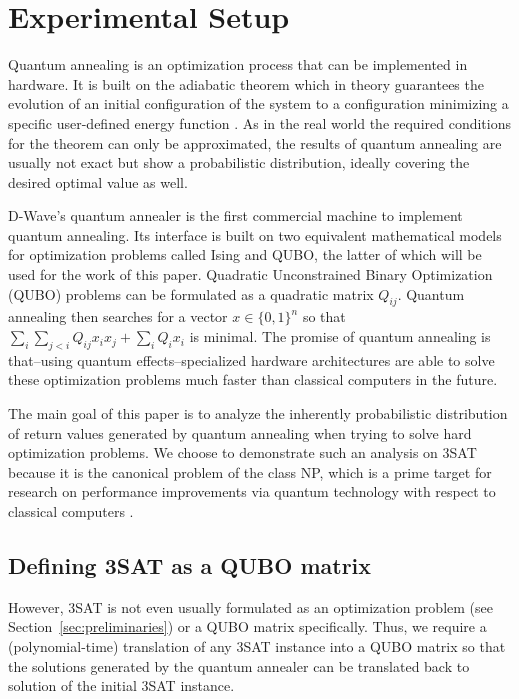 \section{Experimental Setup}
\label{sec:exp-setup}

Quantum annealing is an optimization process that can be implemented in hardware. It is built on the adiabatic theorem which in theory guarantees the evolution of an initial configuration of the system to a configuration minimizing a specific user-defined energy function \cite{mcgeoch2014adiabatic}. As in the real world the required conditions for the theorem can only be approximated, the results of quantum annealing are usually not exact but show a probabilistic distribution, ideally covering the desired optimal value as well.

D-Wave's quantum annealer is the first commercial machine to implement quantum annealing. Its interface is built on two equivalent mathematical models for optimization problems called Ising and QUBO, the latter of which will be used for the work of this paper. Quadratic Unconstrained Binary Optimization (QUBO) problems can be formulated as a quadratic matrix $Q_{ij}$. Quantum annealing then searches for a vector $x \in \{0,1\}^n$ so that $\sum_i \sum_{j < i} Q_{ij} x_i x_j + \sum_i Q_i x_i$ is minimal. The promise of quantum annealing is that--using quantum effects--specialized hardware architectures are able to solve these optimization problems much faster than classical computers in the future.

The main goal of this paper is to analyze the inherently probabilistic distribution of return values generated by quantum annealing when trying to solve hard optimization problems. We choose to demonstrate such an analysis on 3SAT because it is the canonical problem of the class NP, which is a prime target for research on performance improvements via quantum technology with respect to classical computers \cite{}.

\subsection{Defining 3SAT as a QUBO matrix}

However, 3SAT is not even usually formulated as an optimization problem (see Section~\ref{sec:preliminaries}) or a QUBO matrix specifically. Thus, we require a (polynomial-time) translation of any 3SAT instance into a QUBO matrix so that the solutions generated by the quantum annealer can be translated back to solution of the initial 3SAT instance.

